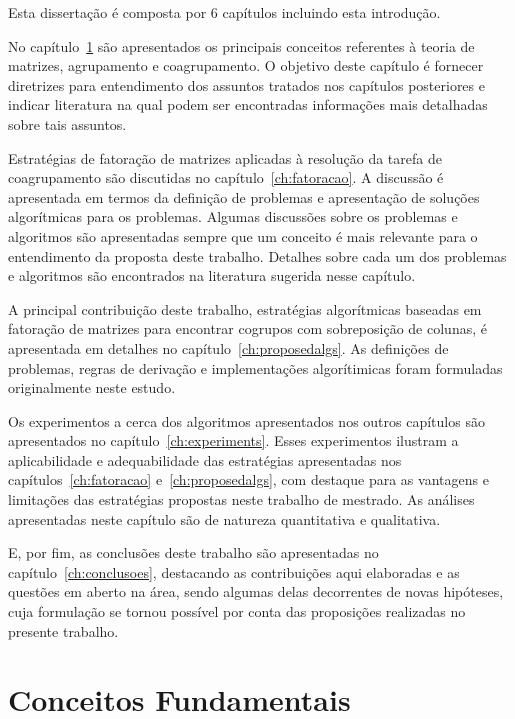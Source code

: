 \documentclass[
    12pt,                %
    oneside,            %
    a4paper,            %
    english,            %
    brazil                %
    ]{abntex2ppgsi}
\begin{document}
Esta dissertação é composta por $6$ capítulos incluindo esta introdução.

No capítulo~\ref{ch:conceitos} são apresentados os principais conceitos referentes à teoria de matrizes, agrupamento e coagrupamento.
O objetivo deste capítulo é fornecer diretrizes para entendimento dos assuntos tratados nos capítulos posteriores e indicar literatura na qual podem ser encontradas informações mais detalhadas sobre tais assuntos.

Estratégias de fatoração de matrizes aplicadas à resolução da tarefa de coagrupamento são discutidas no capítulo~\ref{ch:fatoracao}.
A discussão é apresentada em termos da definição de problemas e apresentação de soluções algorítmicas para os problemas.
Algumas discussões sobre os problemas e algoritmos são apresentadas sempre que um conceito é mais relevante para o entendimento da proposta deste trabalho.
Detalhes sobre cada um dos problemas e algoritmos são encontrados na literatura sugerida nesse capítulo.

A principal contribuição deste trabalho, estratégias algorítmicas baseadas em fatoração de matrizes para encontrar cogrupos com sobreposição de colunas, é apresentada em detalhes no capítulo~\ref{ch:proposedalgs}.
As definições de problemas, regras de derivação e implementações algorítimicas foram formuladas originalmente neste estudo.

Os experimentos a cerca dos algoritmos apresentados nos outros capítulos são apresentados no capítulo~\ref{ch:experiments}.
Esses experimentos ilustram a aplicabilidade e adequabilidade das estratégias apresentadas nos capítulos~\ref{ch:fatoracao} e~\ref{ch:proposedalgs}, com destaque para as vantagens e limitações das estratégias propostas neste trabalho de mestrado.
As análises apresentadas neste capítulo são de natureza quantitativa e qualitativa.

E, por fim, as conclusões deste trabalho são apresentadas no capítulo~\ref{ch:conclusoes}, destacando as contribuições aqui elaboradas e as questões em aberto na área, sendo algumas delas decorrentes de novas hipóteses, cuja formulação se tornou possível por conta das proposições realizadas no presente trabalho.


\chapter{Conceitos Fundamentais}
\label{ch:conceitos}
\end{document}
